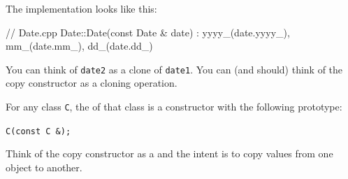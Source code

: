 The implementation looks like this:

\begin{consolethree}[escapeinside=||]
// Date.cpp
Date::Date(const Date & date)
    : yyyy_(date.yyyy_), mm_(date.mm_), dd_(date.dd_)
{}
\end{consolethree}

You can think of \texttt{date2} as a clone of \texttt{date1}. You can (and
should) think of the copy constructor as a cloning operation.

For any class \texttt{C}, the  of that class is a
constructor with the following prototype:

\texttt{C(const C \&);}

Think of the copy constructor as a  and the
intent is to copy values from one object to another.



